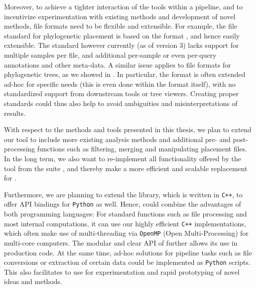 
Moreover, to achieve a tighter interaction of the tools within a pipeline,
and to incentivize experimentation with existing methods and development of novel methods,
file formats need to be flexible and extensible.
For example, the  file standard for phylogenetic placement \cite{Matsen2012}
is based on the  format \cite{JsonMemo,JsonStandard}, and hence easily extensible.
The standard however currently (as of  version 3) lacks support for multiple samples per file,
and additional per-sample or even per-query annotations and other meta-data.
A similar issue applies to file formats for phylogenetic trees, as we showed in \cite{Czech2017}.
In particular, the  format is often extended ad-hoc for specific needs
(this is even done within the  format itself),
with no standardized support from downstream tools or tree viewers.
Creating proper standards could thus also help to avoid ambiguities and misinterpretations of results.


With respect to the methods and tools presented in this thesis,
we plan to extend our  tool to include more existing analysis methods
and additional pre- and post-processing functions such as filtering, merging and manipulating placement files.
In the long term, we also want to re-implement all functionality offered by the
 tool from the  suite \cite{Matsen2010},
and thereby make  a more efficient and scalable replacement for .

Furthermore, we are planning to extend the  library, which is written in \texttt{C++},
to offer \acs{API} bindings for \texttt{Python} as well.
Hence,  could combine the advantages of both programming languages:
For standard functions such as file processing and most internal computations,
it can use our highly efficient \texttt{C++} implementations,
which often make use of multi-threading via \texttt{OpenMP} (Open Multi-Processing) for multi-core computers.
The modular and clear \acs{API} of  further allows its use in production code.
At the same time, ad-hoc solutions for pipeline tasks such as file conversions or extraction of certain data
could be implemented as \texttt{Python} scripts.
This also facilitates to use  for experimentation and rapid prototyping of novel ideas and methods.

